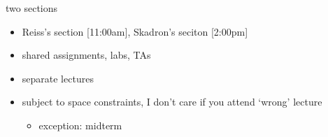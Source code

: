 \begin{frame}{two sections}
    \begin{itemize}
        \item Reiss's section [11:00am], Skadron's seciton [2:00pm]
        \item shared assignments, labs, TAs
        \item separate lectures
        \vspace{.5cm}
        \item subject to space constraints, I don't care if you attend `wrong' lecture
            \begin{itemize}
            \item exception: midterm
            \end{itemize}
    \end{itemize}
\end{frame}
